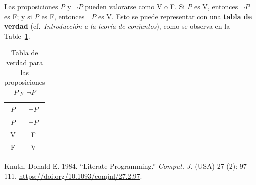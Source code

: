 \documentclass[
  letterpaper,
]{scrbook}
\newlength{\cslhangindent}
\newenvironment{CSLReferences}[2] %
 {\begin{list}{}{%
  \setlength{\itemindent}{0pt}
  \setlength{\leftmargin}{0pt}
  \setlength{\parsep}{0pt}
  \ifodd #1
   \setlength{\leftmargin}{\cslhangindent}
   \setlength{\itemindent}{-1\cslhangindent}
  \fi
  \setlength{\itemsep}{#2\baselineskip}}}
 {\end{list}}
\theoremstyle{definition}
\theoremstyle{remark}
\begin{document}
Las proposiciones \emph{P} y \(\neg P\) pueden valorarse como V o F. Si
\emph{P} es V, entonces \(\neg P\) es F; y si \emph{P} es F, entonces
\(\neg P\) es V. Esto se puede representar con una \textbf{tabla de
verdad} (cf.~\emph{Introducción a la teoría de conjuntos}), como se
observa en la Table~\ref{tbl-verdad-negacion}.

\begin{longtable}[]{@{}cc@{}}
\caption{Tabla de verdad para las proposiciones \(P\) y
\(\neg P\)}\label{tbl-verdad-negacion}\tabularnewline
\toprule\noalign{}
\(P\) & \(\neg P\) \\
\midrule\noalign{}
\endfirsthead
\toprule\noalign{}
\(P\) & \(\neg P\) \\
\midrule\noalign{}
\endhead
\bottomrule\noalign{}
\endlastfoot
V & F \\
F & V \\
\end{longtable}

\protect{}\label{refs}
\begin{CSLReferences}{1}{1}
Knuth, Donald E. 1984. {``Literate Programming.''} \emph{Comput. J.}
(USA) 27 (2): 97--111. \url{https://doi.org/10.1093/comjnl/27.2.97}.

\end{CSLReferences}


\backmatter
\end{document}
